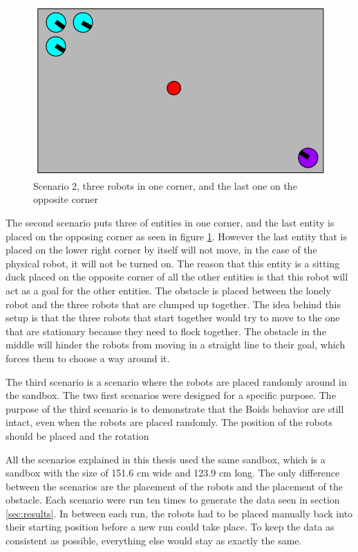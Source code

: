 \begin{figure}[h]
\begin{center}
\includegraphics[width=0.8\linewidth]{figs/scenario1}
\end{center}
\caption[scenario 2]{Scenario 2, three robots in one corner, and the last one on the opposite corner}
\label{fig:scenario1}
\end{figure}
The second scenario puts three of entities in one corner, and the last entity is placed on the opposing corner as seen in figure \ref{fig:scenario1}. However the last entity that is placed on the lower right corner by itself will not move, in the case of the physical robot, it will not be turned on. The reason that this entity is a sitting duck placed on the opposite corner of all the other entities is that this robot will act as a goal for the other entities. The obstacle is placed between the lonely robot and the three robots that are clumped up together. The idea behind this setup is that the three robots that start together would try to move to the one that are stationary because they need to flock together. The obstacle in the middle will hinder the robots from moving in a straight line to their goal, which forces them to choose a way around it. 

The third scenario is a scenario where the robots are placed randomly around in the sandbox. The two first scenarios were designed for a specific purpose. The purpose of the third scenario is to demonstrate that the Boids behavior are still intact, even when the robots are placed randomly. The position of the robots should be placed and the rotation

All the scenarios explained in this thesis used the same sandbox, which is a sandbox with the size of 151.6 cm wide and 123.9 cm long. The only difference between the scenarios are the placement of the robots and the placement of the obstacle. Each scenario were run ten times to generate the data seen in section \ref{sec:results}.
In between each run, the robots had to be placed manually back into their starting position before a new run could take place. To keep the data as consistent as possible, everything else would stay as exactly the same.

